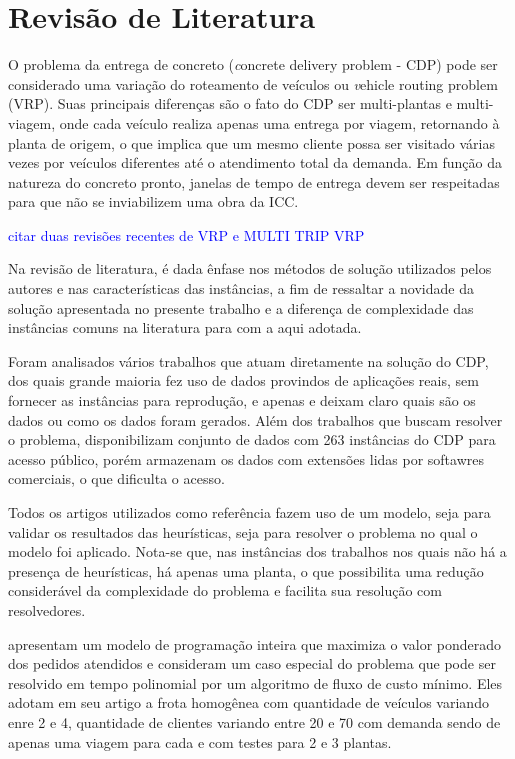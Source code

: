 \chapter{Revisão de Literatura}
O problema da entrega de concreto ({\textit concrete delivery problem} - CDP) pode ser considerado uma variação do roteamento de veículos ou {\textit vehicle routing problem} (VRP). Suas principais diferenças são o fato do CDP ser multi-plantas e multi-viagem, onde cada veículo
realiza apenas uma entrega  por viagem, retornando à planta de origem,
o que implica que um mesmo cliente possa ser visitado várias vezes
por veículos diferentes até o atendimento total da demanda.
Em função da natureza do concreto pronto, janelas de tempo de entrega
devem ser respeitadas para que não se inviabilizem uma obra da ICC.

\textcolor{blue}{citar duas revisões recentes de VRP e MULTI TRIP VRP}

Na revisão de literatura, é dada ênfase nos métodos de solução utilizados pelos autores e nas características das instâncias, a fim de ressaltar a novidade da solução apresentada no presente trabalho e a diferença de complexidade das instâncias comuns na literatura para com a aqui adotada.

Foram analisados vários trabalhos que atuam diretamente na solução do CDP, dos quais grande maioria fez uso de dados provindos de aplicações reais, sem fornecer as instâncias para reprodução, e apenas \cite{tabref1}  e \cite{kinable} deixam claro quais são os dados ou como os dados foram gerados. Além dos trabalhos que buscam resolver o problema, \cite{dados} disponibilizam conjunto de dados com 263 instâncias do CDP para acesso público, porém armazenam os dados com extensões lidas por softawres comerciais, o que dificulta o acesso. 

Todos os artigos utilizados como referência fazem uso de um modelo, seja para validar os resultados das heurísticas, seja para resolver o problema no qual o modelo foi aplicado. Nota-se que, nas instâncias dos trabalhos nos quais não há a presença de heurísticas, há apenas uma planta, o que possibilita uma redução considerável da complexidade do problema e facilita sua resolução com resolvedores. 

\cite{tabref1} apresentam um modelo de programação inteira que maximiza o valor ponderado dos pedidos atendidos e consideram um caso especial do problema que pode ser resolvido em tempo polinomial por um algoritmo de fluxo de custo mínimo. Eles adotam em seu artigo a frota homogênea com quantidade de veículos variando enre 2 e 4, quantidade de clientes variando entre 20 e 70 com demanda sendo de apenas uma viagem para cada e com testes para 2 e 3 plantas.  

